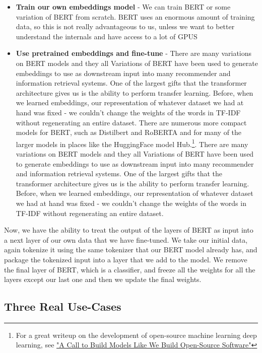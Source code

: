 \documentclass[11pt, table]{diazessay} %
\begin{document}
\begin{sloppypar}
\begin{itemize}
\item \textbf{Train our own embeddings model} - We can train BERT or some variation of BERT from scratch. BERT uses an enormous amount of training data, so this is not really advantageous to us, unless we want to better understand the internals and have access to a lot of GPUS
\item \textbf{Use pretrained embeddings and fine-tune } - There are many variations on BERT models and they all Variations of BERT have been used to generate embeddings to use as downstream input into many recommender and information retrieval systems.  One of the largest gifts that the transformer architecture gives us is the ability to perform transfer learning. Before, when we learned embeddings, our representation of whatever dataset we had at hand was fixed - we couldn't change the weights of the words in TF-IDF without regenerating an entire dataset. There are numerous more compact models for BERT, such as Distilbert and RoBERTA and for many of the larger models in places like the HuggingFace model Hub.\footnote{For a great writeup on the development of open-source machine learning deep learning, see  \href{https://colinraffel.com/blog/a-call-to-build-models-like-we-build-open-source-software.html}{"A Call to Build Models Like We Build Open-Source Software"}}.  There are many variations on BERT models and they all Variations of BERT have been used to generate embeddings to use as downstream input into many recommender and information retrieval systems.  One of the largest gifts that the transformer architecture gives us is the ability to perform transfer learning. Before, when we learned embeddings, our representation of whatever dataset we had at hand was fixed - we couldn't change the weights of the words in TF-IDF without regenerating an entire dataset. 
\end{itemize}


Now, we have the ability to treat the output of the layers of BERT as input into a next layer of our own data that we have fine-tuned. We take our initial data, again tokenize it using the same tokenizer that our BERT model already has, and package the tokenized input into a layer that we add to the model. We remove the final layer of BERT, which is a classifier, and freeze all the weights for all the layers except our last one and then we update the final weights. 

\subsection{Three Real Use-Cases}


\end{sloppypar}
\end{document}
